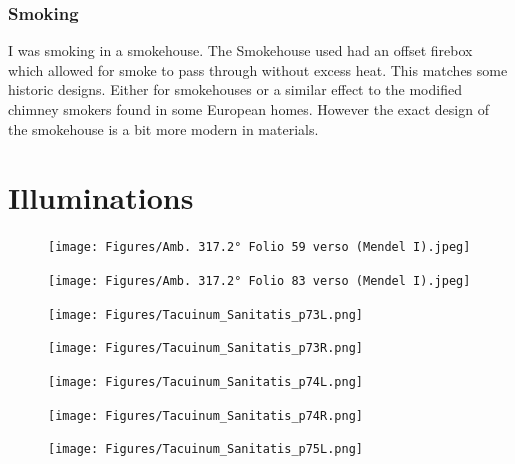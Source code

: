 \documentclass[letterpaper,11pt,leqno]{article}
\begin{document}
\subsubsection{Smoking} I was smoking in a smokehouse. The Smokehouse used had an offset firebox which allowed for smoke to pass through without excess heat. This matches some historic designs. Either for smokehouses or a similar effect to the modified chimney smokers found in some European homes. However the exact design of the smokehouse is a bit more modern in materials.



\FloatBarrier

\section{Illuminations}\label{b:appendix2}

\begin{figure}[!htb]
	\centering
	\texttt{[image: Figures/Amb. 317.2° Folio 59 verso (Mendel I).jpeg]}
	\caption{\citep[page 59 Left]{Mendel}}
\end{figure}

\begin{figure}[!htb]
	\centering
	\texttt{[image: Figures/Amb. 317.2° Folio 83 verso (Mendel I).jpeg]}
	\caption{\citep[page 83 Left]{Mendel}}
\end{figure}

\begin{figure}[!htb]
	\centering
	\texttt{[image: Figures/Tacuinum\_Sanitatis\_p73L.png]}
	\caption{\citep[page 73 Left]{TacSan}}
\end{figure}

\begin{figure}[!htb]
	\centering
	\texttt{[image: Figures/Tacuinum\_Sanitatis\_p73R.png]}
	\caption{\citep[page 73 Right]{TacSan}}
\end{figure}

\begin{figure}[!htb]
	\centering
	\texttt{[image: Figures/Tacuinum\_Sanitatis\_p74L.png]}
	\caption{\citep[page 74 Left]{TacSan}}
\end{figure}

\begin{figure}[!htb]
	\centering
	\texttt{[image: Figures/Tacuinum\_Sanitatis\_p74R.png]}
	\caption{\citep[page 74 Right]{TacSan}}
\end{figure}

\begin{figure}[!htb]
	\centering
	\texttt{[image: Figures/Tacuinum\_Sanitatis\_p75L.png]}
	\caption{\citep[page 75 Left]{TacSan}}
\end{figure}
\end{document}
